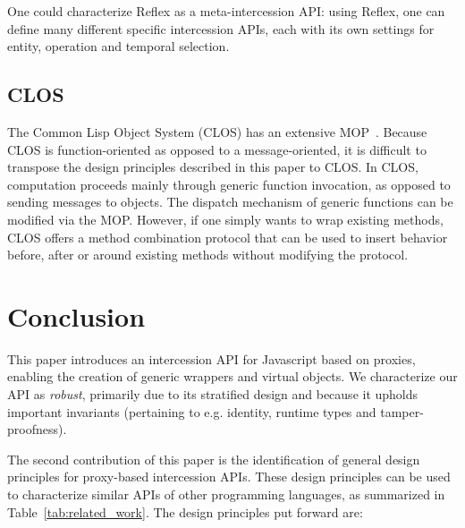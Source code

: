 \documentclass{sig-alternate}
\begin{document}
One could characterize Reflex as a meta-intercession API: using Reflex, one can define many different specific intercession APIs, each with its own settings for entity, operation and temporal selection.

\subsection{CLOS}
\label{sub:clos}

The Common Lisp Object System (CLOS) has an extensive MOP~\cite{kiczales91art}. Because CLOS is function-oriented as opposed to a message-oriented, it is difficult to transpose the design principles described in this paper to CLOS. In CLOS, computation proceeds mainly through generic function invocation, as opposed to sending messages to objects. The dispatch mechanism of generic functions can be modified via the MOP. However, if one simply wants to wrap existing methods, CLOS offers a method combination protocol that can be used to insert behavior before, after or around existing methods without modifying the protocol.


\section{Conclusion}

This paper introduces an intercession API for Javascript based on proxies, enabling the creation of generic wrappers and virtual objects. We characterize our API as \emph{robust}, primarily due to its stratified design and because it upholds important invariants (pertaining to e.g. identity, runtime types and tamper-proofness).

The second contribution of this paper is the identification of general design principles for proxy-based intercession APIs. These design principles can be used to characterize similar APIs of other programming languages, as summarized in Table~\ref{tab:related_work}. The design principles put forward are:
\end{document}
